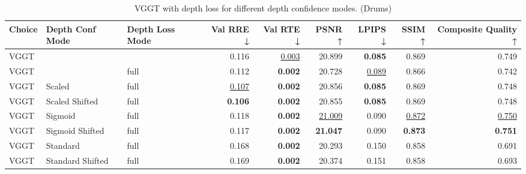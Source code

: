 \begin{table}[H]
\caption{\ifdefined\customcaption \customcaption \else VGGT with depth loss for different depth confidence modes. (Drums) \fi}
\label{tab:05_depth_conf_mode_drums}
\centering
\scriptsize
\begin{tabular}{lllrrrrrr}
\toprule
Choice & Depth Conf Mode & Depth Loss Mode & Val RRE ↓ & Val RTE ↓ & PSNR ↑ & LPIPS ↓ & SSIM ↑ & Composite Quality ↑ \\
\midrule
VGGT &  &  & 0.116 & \underline{0.003} & 20.899 & \textbf{0.085} & 0.869 & 0.749 \\
VGGT &  & full & 0.112 & \textbf{0.002} & 20.728 & \underline{0.089} & 0.866 & 0.742 \\
VGGT & Scaled & full & \underline{0.107} & \textbf{0.002} & 20.856 & \textbf{0.085} & 0.869 & 0.748 \\
VGGT & Scaled Shifted & full & \textbf{0.106} & \textbf{0.002} & 20.855 & \textbf{0.085} & 0.869 & 0.748 \\
VGGT & Sigmoid & full & 0.118 & \textbf{0.002} & \underline{21.009} & 0.090 & \underline{0.872} & \underline{0.750} \\
VGGT & Sigmoid Shifted & full & 0.117 & \textbf{0.002} & \textbf{21.047} & 0.090 & \textbf{0.873} & \textbf{0.751} \\
VGGT & Standard & full & 0.168 & \textbf{0.002} & 20.293 & 0.150 & 0.858 & 0.691 \\
VGGT & Standard Shifted & full & 0.169 & \textbf{0.002} & 20.374 & 0.151 & 0.858 & 0.693 \\
\bottomrule
\end{tabular}
\end{table}